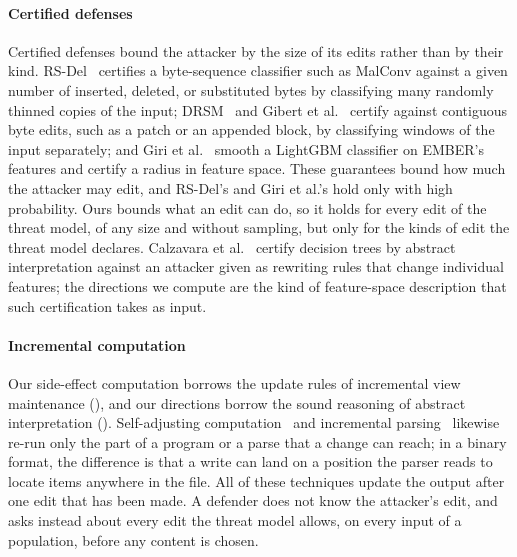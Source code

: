 \paragraph{Certified defenses}
Certified defenses bound the attacker by the size of its edits rather than by their kind.
RS-Del~\cite{huang2023rs} certifies a byte-sequence classifier such as MalConv against a given number of inserted,
deleted, or substituted bytes by classifying many randomly thinned copies of the input; DRSM~\cite{saha2024drsm} and
Gibert et al.~\cite{gibert2023certified} certify against contiguous byte edits, such as a patch or an appended block, by
classifying windows of the input separately; and Giri et al.~\cite{giri2026towards} smooth a LightGBM classifier on
EMBER's features and certify a radius in feature space. These guarantees bound how much the attacker may edit, and
RS-Del's and Giri et al.'s hold only with high probability. Ours bounds what an edit can do, so it holds for every edit
of the threat model, of any size and without sampling, but only for the kinds of edit the threat model declares.
Calzavara et al.~\cite{calzavara2020certifying} certify decision trees by abstract interpretation against an attacker
given as rewriting rules that change individual features; the directions we compute are the kind of feature-space
description that such certification takes as input.

\paragraph{Incremental computation}
Our side-effect computation borrows the update rules of incremental view maintenance (), and
our directions borrow the sound reasoning of abstract interpretation (). Self-adjusting
computation~\cite{acar2002adaptive} and incremental parsing~\cite{wagner1998efficient} likewise re-run only the part of a
program or a parse that a change can reach; in a binary format, the difference is that a write can land on a position
the parser reads to locate items anywhere in the file. All of these techniques update the output after one edit that has
been made. A defender does not know the attacker's edit, and asks instead about every edit the threat model allows, on
every input of a population, before any content is chosen.
